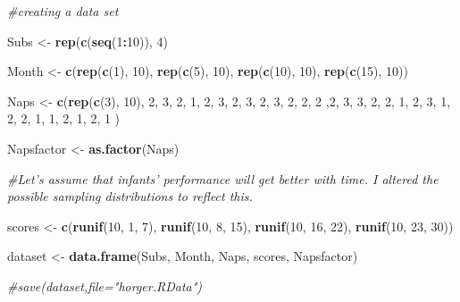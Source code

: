\documentclass[]{book}
\newenvironment{Shaded}{\begin{snugshade}}{\end{snugshade}}
\newcommand{\CommentTok}[1]{\textcolor[rgb]{0.56,0.35,0.01}{\textit{#1}}}
\newcommand{\DecValTok}[1]{\textcolor[rgb]{0.00,0.00,0.81}{#1}}
\newcommand{\KeywordTok}[1]{\textcolor[rgb]{0.13,0.29,0.53}{\textbf{#1}}}
\newcommand{\NormalTok}[1]{#1}
\newcommand{\OperatorTok}[1]{\textcolor[rgb]{0.81,0.36,0.00}{\textbf{#1}}}
\newcommand{\StringTok}[1]{\textcolor[rgb]{0.31,0.60,0.02}{#1}}
\begin{document}
\begin{Shaded}
\begin{Highlighting}[]
\CommentTok{#creating a data set }

\NormalTok{Subs <-}\StringTok{ }\KeywordTok{rep}\NormalTok{(}\KeywordTok{c}\NormalTok{(}\KeywordTok{seq}\NormalTok{(}\DecValTok{1}\OperatorTok{:}\DecValTok{10}\NormalTok{)), }\DecValTok{4}\NormalTok{)}

\NormalTok{Month <-}\StringTok{ }\KeywordTok{c}\NormalTok{(}\KeywordTok{rep}\NormalTok{(}\KeywordTok{c}\NormalTok{(}\DecValTok{1}\NormalTok{), }\DecValTok{10}\NormalTok{), }\KeywordTok{rep}\NormalTok{(}\KeywordTok{c}\NormalTok{(}\DecValTok{5}\NormalTok{), }\DecValTok{10}\NormalTok{), }\KeywordTok{rep}\NormalTok{(}\KeywordTok{c}\NormalTok{(}\DecValTok{10}\NormalTok{), }\DecValTok{10}\NormalTok{), }\KeywordTok{rep}\NormalTok{(}\KeywordTok{c}\NormalTok{(}\DecValTok{15}\NormalTok{), }\DecValTok{10}\NormalTok{))}

\NormalTok{Naps <-}\StringTok{ }\KeywordTok{c}\NormalTok{(}\KeywordTok{rep}\NormalTok{(}\KeywordTok{c}\NormalTok{(}\DecValTok{3}\NormalTok{), }\DecValTok{10}\NormalTok{), }\DecValTok{2}\NormalTok{, }\DecValTok{3}\NormalTok{, }\DecValTok{2}\NormalTok{, }\DecValTok{1}\NormalTok{, }\DecValTok{2}\NormalTok{, }\DecValTok{3}\NormalTok{, }\DecValTok{2}\NormalTok{, }\DecValTok{3}\NormalTok{, }\DecValTok{2}\NormalTok{, }\DecValTok{3}\NormalTok{, }\DecValTok{2}\NormalTok{, }\DecValTok{2}\NormalTok{, }\DecValTok{2}\NormalTok{ ,}\DecValTok{2}\NormalTok{, }\DecValTok{3}\NormalTok{, }\DecValTok{3}\NormalTok{, }\DecValTok{2}\NormalTok{, }\DecValTok{2}\NormalTok{, }\DecValTok{1}\NormalTok{, }\DecValTok{2}\NormalTok{, }\DecValTok{3}\NormalTok{, }\DecValTok{1}\NormalTok{, }\DecValTok{2}\NormalTok{, }\DecValTok{2}\NormalTok{, }\DecValTok{1}\NormalTok{, }\DecValTok{1}\NormalTok{, }\DecValTok{2}\NormalTok{, }\DecValTok{1}\NormalTok{, }\DecValTok{2}\NormalTok{, }\DecValTok{1}\NormalTok{ )}

\NormalTok{Napsfactor <-}\StringTok{ }\KeywordTok{as.factor}\NormalTok{(Naps)}

\CommentTok{#Let's assume that infants' performance will get better with time. I altered the possible sampling distributions to reflect this. }

\NormalTok{scores <-}\StringTok{ }\KeywordTok{c}\NormalTok{(}\KeywordTok{runif}\NormalTok{(}\DecValTok{10}\NormalTok{, }\DecValTok{1}\NormalTok{, }\DecValTok{7}\NormalTok{), }\KeywordTok{runif}\NormalTok{(}\DecValTok{10}\NormalTok{, }\DecValTok{8}\NormalTok{, }\DecValTok{15}\NormalTok{), }\KeywordTok{runif}\NormalTok{(}\DecValTok{10}\NormalTok{, }\DecValTok{16}\NormalTok{, }\DecValTok{22}\NormalTok{), }\KeywordTok{runif}\NormalTok{(}\DecValTok{10}\NormalTok{, }\DecValTok{23}\NormalTok{, }\DecValTok{30}\NormalTok{))}


\NormalTok{dataset <-}\StringTok{ }\KeywordTok{data.frame}\NormalTok{(Subs, Month, Naps, scores, Napsfactor)}

\CommentTok{#save(dataset,file="horger.RData")}
\end{Highlighting}
\end{Shaded}
\end{document}
